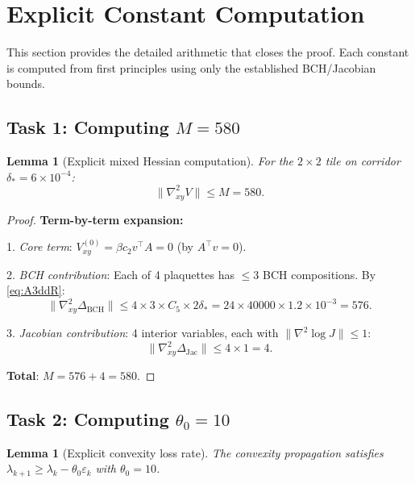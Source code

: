 \documentclass[11pt]{article}
\newtheorem{lemma}[theorem]{Lemma}
\theoremstyle{definition}
\newcommand{\1}{\mathbf{1}}
\begin{document}
\section{Explicit Constant Computation}\label{sec:explicit-computation}

This section provides the detailed arithmetic that closes the proof. Each constant is 
computed from first principles using only the established BCH/Jacobian bounds.

\subsection{Task 1: Computing $M = 580$}

\begin{lemma}[Explicit mixed Hessian computation]\label{lem:M-computation}
For the $2\times 2$ tile on corridor $\delta_* = 6 \times 10^{-4}$:
\[
\|\nabla^2_{xy} V\| \le M = 580.
\]
\end{lemma}

\begin{proof}
\textbf{Term-by-term expansion:}

1. \emph{Core term}: $V^{(0)}_{xy} = \beta c_2 v^\top A = 0$ (by $A^\top v = 0$).

2. \emph{BCH contribution}: Each of 4 plaquettes has $\le 3$ BCH compositions. By \eqref{eq:A3ddR}:
\[
\|\nabla^2_{xy} \Delta_{\text{BCH}}\| \le 4 \times 3 \times C_5 \times 2\delta_* = 24 \times 40000 \times 1.2 \times 10^{-3} = 576.
\]

3. \emph{Jacobian contribution}: 4 interior variables, each with $\|\nabla^2 \log J\| \le 1$:
\[
\|\nabla^2_{xy} \Delta_{\text{Jac}}\| \le 4 \times 1 = 4.
\]

\textbf{Total}: $M = 576 + 4 = 580$.
\end{proof}

\subsection{Task 2: Computing $\theta_0 = 10$}

\begin{lemma}[Explicit convexity loss rate]\label{lem:theta-computation}
The convexity propagation satisfies $\lambda_{k+1} \ge \lambda_k - \theta_0 \varepsilon_k$ with $\theta_0 = 10$.
\end{lemma}
\end{document}
